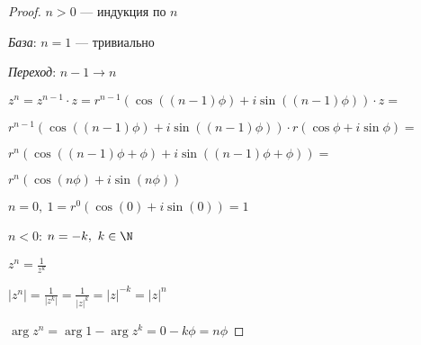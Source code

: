 \begin{proof}

    $n > 0$ --- индукция по $n$

    \textsl{База}: $n = 1$ --- тривиально
    
    \textsl{Переход}: $n - 1 \to n$
    
    $z^n = z^{n-1} \cdot z = r^{n-1}(\cos((n-1)\phi) + i\sin((n-1)\phi)) \cdot z = $
    
    $r^{n-1}(\cos((n-1)\phi) + i\sin((n-1)\phi)) \cdot r(\cos\phi + i\sin\phi) = $
    
    $r^n(\cos((n-1)\phi + \phi) + i\sin((n-1)\phi + \phi)) = $
    
    $r^n(\cos(n\phi) + i\sin(n\phi))$

    $n = 0,~ 1 = r^0(\cos(0) + i\sin(0)) = 1$

    $n < 0$: $n = -k,~k \in \N$

    $z^n = \frac{1}{z^k}$
    
    $|z^n| = \frac{1}{|z^k|} = \frac{1}{|z|^k} = |z|^{-k} = |z|^n$
    
    $\arg z^n = \arg 1 - \arg z^k = 0 - k \phi = n \phi$
\end{proof}
